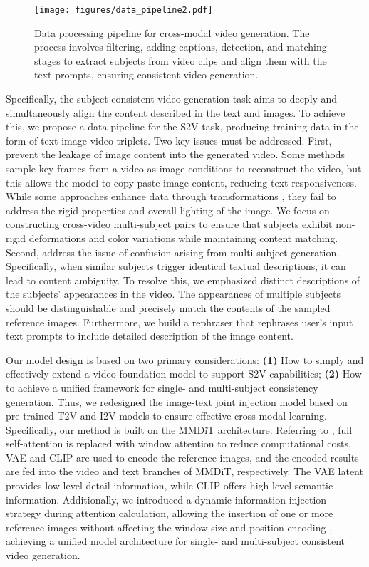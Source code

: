 \begin{figure*}[t]
	\centering
	\texttt{[image: figures/data\_pipeline2.pdf]} 
	\caption{Data processing pipeline for cross-modal video generation. The process involves filtering, adding captions, detection, and matching stages to extract subjects from video clips and align them with the text prompts, ensuring consistent video generation.}
	\label{fig:data_pipeline}
\end{figure*}

Specifically, the subject-consistent video generation task aims to deeply and simultaneously align the content described in the text and images. To achieve this, we propose a data pipeline for the S2V task, producing training data in the form of text-image-video triplets. Two key issues must be addressed. First, prevent the leakage of image content into the generated video. Some methods \cite{chen2025multi, huang2025conceptmaster, liang2025movie, yuan2024identity, he2024id} sample key frames from a video as image conditions to reconstruct the video, but this allows the model to copy-paste image content, reducing text responsiveness. While some approaches enhance data through transformations \cite{chen2025multi}, they fail to address the rigid properties and overall lighting of the image. We focus on constructing cross-video multi-subject pairs to ensure that subjects exhibit non-rigid deformations and color variations while maintaining content matching. Second, address the issue of confusion arising from multi-subject generation. Specifically, when similar subjects trigger identical textual descriptions, it can lead to content ambiguity. To resolve this, we emphasized distinct descriptions of the subjects' appearances in the video. The appearances of multiple subjects should be distinguishable and precisely match the contents of the sampled reference images. Furthermore, we build a rephraser that rephrases user's input text prompts to include detailed description of the image content.

Our model design is based on two primary considerations: \textbf{(1)} How to simply and effectively extend a video foundation model to support S2V capabilities; \textbf{(2)} How to achieve a unified framework for single- and multi-subject consistency generation. 
Thus, we redesigned the image-text joint injection model based on pre-trained T2V and I2V models \cite{lin2025diffusion} to ensure effective cross-modal learning. 
Specifically, our method is built on the MMDiT \cite{esser2024scaling} architecture. Referring to \cite{wang2025seedvr}, full self-attention is replaced with window attention to reduce computational costs. VAE \cite{esser2021taming} and CLIP \cite{zhai2023sigmoid} are used to encode the reference images, and the encoded results are fed into the video and text branches of MMDiT, respectively.
The VAE latent provides low-level detail information, while CLIP offers high-level semantic information.
Additionally, we introduced a dynamic information injection strategy during attention calculation, allowing the insertion of one or more reference images without affecting the window size and position encoding \cite{su2024roformer}, achieving a unified model architecture for single- and multi-subject consistent video generation.


